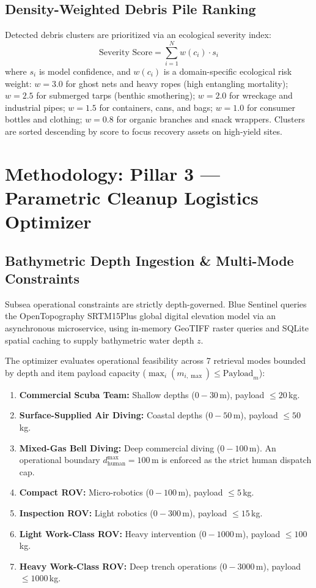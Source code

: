 \documentclass[conference]{IEEEtran}
\begin{document}
\subsection{Density-Weighted Debris Pile Ranking}
Detected debris clusters are prioritized via an ecological severity index:
\begin{equation}
\text{Severity Score} = \sum_{i=1}^{N} w(c_i) \cdot s_i
\label{eq:severity_score}
\end{equation}
where $s_i$ is model confidence, and $w(c_i)$ is a domain-specific ecological risk weight: $w=3.0$ for ghost nets and heavy ropes (high entangling mortality); $w=2.5$ for submerged tarps (benthic smothering); $w=2.0$ for wreckage and industrial pipes; $w=1.5$ for containers, cans, and bags; $w=1.0$ for consumer bottles and clothing; $w=0.8$ for organic branches and snack wrappers. Clusters are sorted descending by score to focus recovery assets on high-yield sites.

\section{Methodology: Pillar 3 --- Parametric Cleanup Logistics Optimizer}

\subsection{Bathymetric Depth Ingestion \& Multi-Mode Constraints}
Subsea operational constraints are strictly depth-governed. Blue Sentinel queries the OpenTopography SRTM15Plus global digital elevation model via an asynchronous microservice, using in-memory GeoTIFF raster queries and SQLite spatial caching to supply bathymetric water depth $z$.

The optimizer evaluates operational feasibility across 7 retrieval modes bounded by depth and item payload capacity ($\max_i(m_{i,\max}) \le \text{Payload}_m$):
\begin{enumerate}
    \item \textbf{Commercial Scuba Team:} Shallow depths ($0 - 30$\,m), payload $\le 20$\,kg.
    \item \textbf{Surface-Supplied Air Diving:} Coastal depths ($0 - 50$\,m), payload $\le 50$\,kg.
    \item \textbf{Mixed-Gas Bell Diving:} Deep commercial diving ($0 - 100$\,m). An operational boundary $d_{\text{human}}^{\max} = 100$\,m is enforced as the strict human dispatch cap.
    \item \textbf{Compact ROV:} Micro-robotics ($0 - 100$\,m), payload $\le 5$\,kg.
    \item \textbf{Inspection ROV:} Light robotics ($0 - 300$\,m), payload $\le 15$\,kg.
    \item \textbf{Light Work-Class ROV:} Heavy intervention ($0 - 1000$\,m), payload $\le 100$\,kg.
    \item \textbf{Heavy Work-Class ROV:} Deep trench operations ($0 - 3000$\,m), payload $\le 1000$\,kg.
\end{enumerate}
\end{document}
